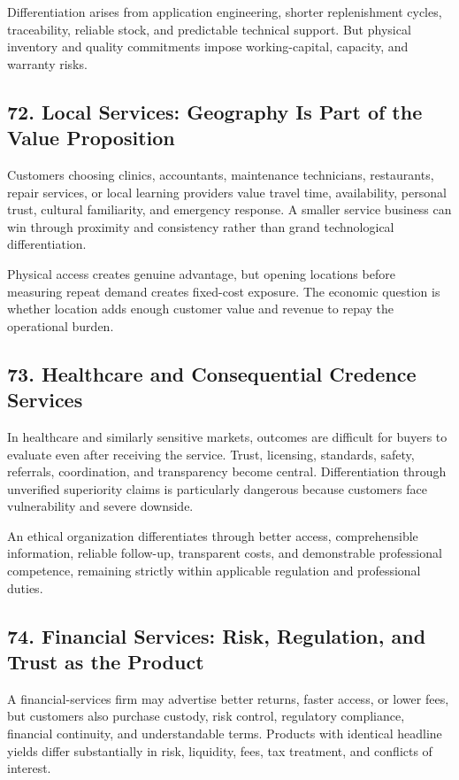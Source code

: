 Differentiation arises from application engineering, shorter replenishment cycles, traceability, reliable stock, and predictable technical support. But physical inventory and quality commitments impose working-capital, capacity, and warranty risks.

\subsection*{72. Local Services: Geography Is Part of the Value Proposition}

Customers choosing clinics, accountants, maintenance technicians, restaurants, repair services, or local learning providers value travel time, availability, personal trust, cultural familiarity, and emergency response. A smaller service business can win through proximity and consistency rather than grand technological differentiation.

Physical access creates genuine advantage, but opening locations before measuring repeat demand creates fixed-cost exposure. The economic question is whether location adds enough customer value and revenue to repay the operational burden.

\subsection*{73. Healthcare and Consequential Credence Services}

In healthcare and similarly sensitive markets, outcomes are difficult for buyers to evaluate even after receiving the service. Trust, licensing, standards, safety, referrals, coordination, and transparency become central. Differentiation through unverified superiority claims is particularly dangerous because customers face vulnerability and severe downside.

An ethical organization differentiates through better access, comprehensible information, reliable follow-up, transparent costs, and demonstrable professional competence, remaining strictly within applicable regulation and professional duties.

\subsection*{74. Financial Services: Risk, Regulation, and Trust as the Product}

A financial-services firm may advertise better returns, faster access, or lower fees, but customers also purchase custody, risk control, regulatory compliance, financial continuity, and understandable terms. Products with identical headline yields differ substantially in risk, liquidity, fees, tax treatment, and conflicts of interest.

